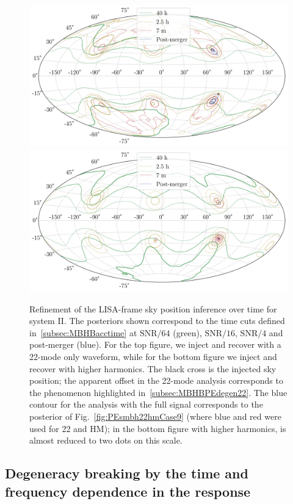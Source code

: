 \documentclass[aps,showpacs,twocolumn,prd,superscriptaddress,nofootinbib]{revtex4-1}
\begin{document}
\begin{figure}
  \centering
  \includegraphics[width=.8\linewidth]{../plots/skymap_Lframe_tseries_bambi_22.png}
  \includegraphics[width=.8\linewidth]{../plots/skymap_Lframe_tseries_ptmcmc_hm.png}
  \caption{Refinement of the LISA-frame sky position inference over time for system II. The posteriors shown correspond to the time cuts defined in~\ref{subsec:MBHBacctime} at $\mathrm{SNR}/64$ (green), $\mathrm{SNR}/16$, $\mathrm{SNR}/4$ and post-merger (blue). For the top figure, we inject and recover with a 22-mode only waveform, while for the bottom figure we inject and recover with higher harmonics. The black cross is the injected sky position; the apparent offset in the 22-mode analysis corresponds to the phenomenon highlighted in~\ref{subsec:MBHBPEdegen22}. The blue contour for the analysis with the full signal corresponds to the posterior of Fig.~\ref{fig:PEsmbh22hmCase9} (where blue and red were used for 22 and HM); in the bottom figure with higher harmonics, is almost reduced to two dots on this scale.}
  \label{fig:MollweidesmbhTseriesCase922hm}
\end{figure}

\subsection{Degeneracy breaking by the time and frequency dependence in the response}
\label{subsec:MBHBacctimebreakdegen}
\end{document}
